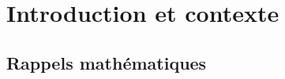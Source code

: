 \documentclass[a4paper,11pt]{article}
\title{\chapterTitle}
\author{}
\date{}
\makeatletter
\renewcommand\maketitle{{\raggedright\begin{center}
    {\Huge\bfseries\@title}
\end{center}}}
\theoremstyle{definition}
\newcommand{\highlight}[1]{{\color{niceblue}\emph{#1}}}
\makeatother
\begin{document}
\selectfont
\fontsize{12pt}{14pt}\selectfont

\maketitle
\thispagestyle{fancy}



\section{Introduction et contexte}


\subsection{Rappels mathématiques}

\end{document}
